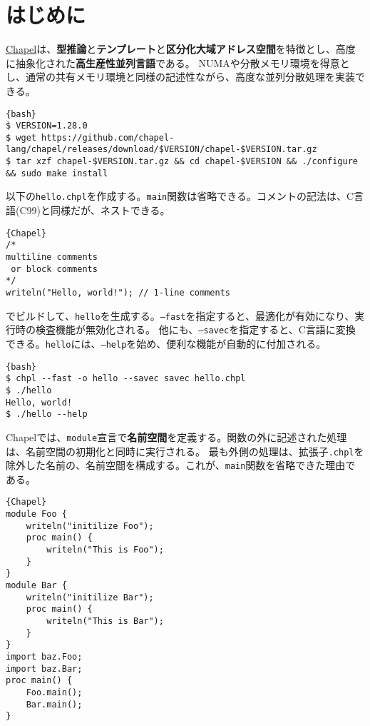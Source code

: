 \documentclass[10pt,a4paper]{book}
\begin{document}
\maketitle
\tableofcontents

\chapter{はじめに}

\href{https://chapel-lang.org}{Chapel}は、\textbf{型推論}と\textbf{テンプレート}と\textbf{区分化大域アドレス空間}を特徴とし、高度に抽象化された\textbf{高生産性並列言語}である。
NUMAや分散メモリ環境を得意とし、通常の共有メモリ環境と同様の記述性ながら、高度な並列分散処理を実装できる。

\begin{Verbatim}{bash}
$ VERSION=1.28.0
$ wget https://github.com/chapel-lang/chapel/releases/download/$VERSION/chapel-$VERSION.tar.gz
$ tar xzf chapel-$VERSION.tar.gz && cd chapel-$VERSION && ./configure && sudo make install
\end{Verbatim}

以下の\texttt{hello.chpl}を作成する。\texttt{main}関数は省略できる。コメントの記法は、C言語(C99)と同様だが、ネストできる。

\begin{Verbatim}{Chapel}
/*
multiline comments
 or block comments
*/
writeln("Hello, world!"); // 1-line comments
\end{Verbatim}

\chpl{}でビルドして、\texttt{hello}を生成する。\texttt{--fast}を指定すると、最適化が有効になり、実行時の検査機能が無効化される。
他にも、\texttt{--savec}を指定すると、C言語に変換できる。\texttt{hello}には、\texttt{--help}を始め、便利な機能が自動的に付加される。

\begin{Verbatim}{bash}
$ chpl --fast -o hello --savec savec hello.chpl
$ ./hello
Hello, world!
$ ./hello --help
\end{Verbatim}

Chapelでは、\texttt{module}宣言で\textbf{名前空間}を定義する。関数の外に記述された処理は、名前空間の初期化と同時に実行される。
最も外側の処理は、拡張子\texttt{.chpl}を除外した名前の、名前空間を構成する。これが、\texttt{main}関数を省略できた理由である。

\begin{Verbatim}{Chapel}
module Foo {
	writeln("initilize Foo");
	proc main() {
		writeln("This is Foo");
	}
}
module Bar {
	writeln("initilize Bar");
	proc main() {
		writeln("This is Bar");
	}
}
import baz.Foo;
import baz.Bar;
proc main() {
	Foo.main();
	Bar.main();
}
\end{Verbatim}
\end{document}
